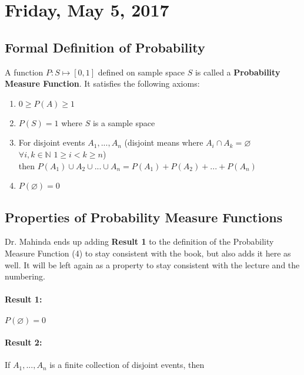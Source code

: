\documentclass[12pt]{article}
\begin{document}
\newpage

\section{Friday, May 5, 2017}

\subsection{Formal Definition of Probability}

\begin{tcolorbox}[title= Probability Measure Function (PMF)]

A function $P:S\longmapsto [0,1]$ defined on sample space $S$ is called a \textbf{Probability Measure Function}. It satisfies the following axioms:
\begin{enumerate}
	\item{$0 \geq P(A) \geq 1$}
	\item{$P(S) = 1$ where $S$ is a sample space}
	\item{
	For disjoint events $A_1, ... , A_n$ (disjoint means where $A_i \cap A_k = \varnothing$\\
	$\forall i,k \in\mathbb{N}$ $1 \geq i < k \geq n$)\\
	then $P(A_1) \cup A_2 \cup ... \cup A_n = P(A_1) + P(A_2) + ... + P(A_n)$
	}
	\item{$P(\varnothing) = 0$}
\end{enumerate}
\end{tcolorbox}

\subsection{Properties of Probability Measure Functions}

Dr. Mahinda ends up adding \textbf{Result 1} to the definition of the Probability Measure Function (4) to stay consistent with the book, but also adds it here as well. It will be left again as a property to stay consistent with the lecture and the numbering.

\paragraph{Result 1:} $P(\varnothing) = 0$
\paragraph{Result 2:} If $A_1, ... , A_n$ is a finite collection of disjoint events, then
\end{document}
